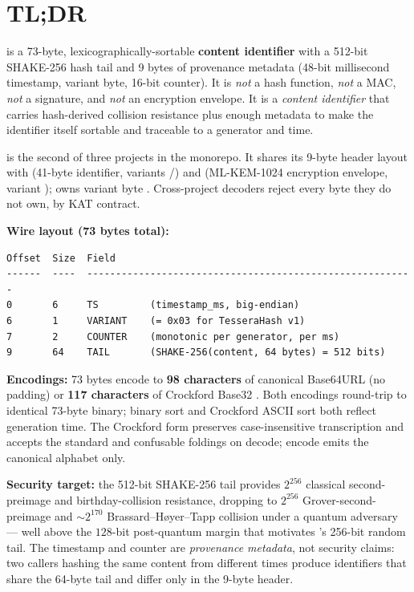 \section*{TL;DR}

\tesserahash{} is a 73-byte, lexicographically-sortable \textbf{content identifier} with a 512-bit SHAKE-256 \citep{fips202} hash tail and 9 bytes of provenance metadata (48-bit millisecond timestamp, variant byte, 16-bit counter). It is \emph{not} a hash function, \emph{not} a MAC, \emph{not} a signature, and \emph{not} an encryption envelope. It is a \emph{content identifier} that carries hash-derived collision resistance plus enough metadata to make the identifier itself sortable and traceable to a generator and time.

\tesserahash{} is the second of three projects in the \tessera{} monorepo. It shares its 9-byte header layout with \tesseraid{} \citep{rfc4648,grover1996} (41-byte identifier, variants /) and \tesseraseal{} (ML-KEM-1024 \citep{fips203} encryption envelope, variant ); \tesserahash{} owns variant byte . Cross-project decoders reject every byte they do not own, by KAT contract.

\textbf{Wire layout (73 bytes total):}
\begin{lstlisting}[language=Pseudocode]
Offset  Size  Field
------  ----  ---------------------------------------------------------
0       6     TS         (timestamp_ms, big-endian)
6       1     VARIANT    (= 0x03 for TesseraHash v1)
7       2     COUNTER    (monotonic per generator, per ms)
9       64    TAIL       (SHAKE-256(content, 64 bytes) = 512 bits)
\end{lstlisting}

\textbf{Encodings:} 73 bytes encode to \textbf{98 characters} of canonical Base64URL \citep{rfc4648} (no padding) or \textbf{117 characters} of Crockford Base32 \citep{crockford}. Both encodings round-trip to identical 73-byte binary; binary sort and Crockford ASCII sort both reflect generation time. The Crockford form preserves case-insensitive transcription and accepts the standard  and  confusable foldings on decode; encode emits the canonical alphabet only.

\textbf{Security target:} the 512-bit SHAKE-256 tail provides $2^{256}$ classical second-preimage and birthday-collision resistance, dropping to $2^{256}$ Grover-second-preimage \citep{grover1996} and $\sim 2^{170}$ Brassard--H{\o}yer--Tapp \citep{bht1998} collision under a quantum adversary --- well above the $128$-bit post-quantum margin that motivates \tesseraid{}'s 256-bit random tail. The timestamp and counter are \emph{provenance metadata}, not security claims: two callers hashing the same content from different times produce identifiers that share the 64-byte tail and differ only in the 9-byte header.

